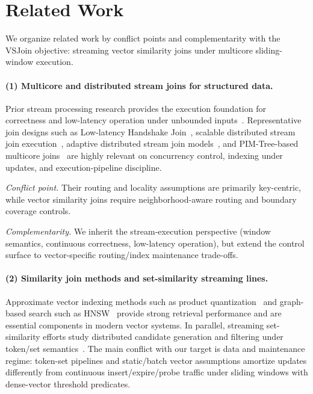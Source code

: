 \section{Related Work}
\label{sec:related-work}

We organize related work by conflict points and complementarity with the VSJoin objective: streaming vector similarity joins under multicore sliding-window execution.

\paragraph{(1) Multicore and distributed stream joins for structured data.}
Prior stream processing research provides the execution foundation for correctness and low-latency operation under unbounded inputs~\cite{akidau2015dataflow}. Representative join designs such as Low-latency Handshake Join~\cite{roy2014llhj}, scalable distributed stream join execution~\cite{lin2015scalable}, adaptive distributed stream join models~\cite{wang2024lowlatency}, and PIM-Tree-based multicore joins~\cite{shahvarani2020pimtree} are highly relevant on concurrency control, indexing under updates, and execution-pipeline discipline.

\textit{Conflict point.} Their routing and locality assumptions are primarily key-centric, while vector similarity joins require neighborhood-aware routing and boundary coverage controls.

\textit{Complementarity.} We inherit the stream-execution perspective (window semantics, continuous correctness, low-latency operation), but extend the control surface to vector-specific routing/index maintenance trade-offs.

\paragraph{(2) Similarity join methods and set-similarity streaming lines.}
Approximate vector indexing methods such as product quantization~\cite{jegou2011product} and graph-based search such as HNSW~\cite{malkov2018efficient} provide strong retrieval performance and are essential components in modern vector systems. In parallel, streaming set-similarity efforts study distributed candidate generation and filtering under token/set semantics~\cite{yang2020distributed,rafiei2020similarity,morales2016streaming}. The main conflict with our target is data and maintenance regime: token-set pipelines and static/batch vector assumptions amortize updates differently from continuous insert/expire/probe traffic under sliding windows with dense-vector threshold predicates.

